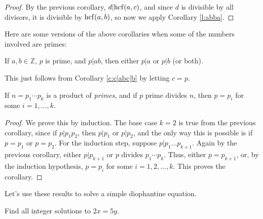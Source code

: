 \documentclass[11pt,dvipsnames]{book}
\def\hcf{{\rm hcf}}
\numberwithin{equation}{section} %
\numberwithin{figure}{section} %
\numberwithin{table}{section} %
\begin{document}
\begin{proof}
By the previous corollary, $d|\hcf(a,c)$, and since $d$ is divisible by all divisors, it is divisible by $\hcf(a,b)$, so now we apply Corollary \ref{l:abba}.
\end{proof}


Here are some versions of the above corollaries when some of the numbers involved are primes:

\begin{corollary}
\label{c:p|ab}
If $a,b\in\mathbb{Z}$, $p$ is prime, and $p|ab$, then either $p|a$ or $p|b$ (or both).
\end{corollary}

This just follows from Corollary \ref{c:c|abc|b} by letting $c=p$. 







%  
 \begin{corollary}
 \label{c:p|p...p}
If $n=p_1\cdots p_k$ is a product of \emph{primes}, and if $p$ prime divides $n$, then $p=p_i$ for some $i=1,\ldots, k$.
\end{corollary}
 
 \begin{proof}
We prove this by induction. The base case $k=2$ is true from the previous corollary, since if $p|p_{1}p_{2}$, then $p|p_{1}$ or $p|p_{2}$, and the only way this is possible is if $p=p_{1}$ or $p=p_{2}$. For the induction step, suppose $p|p_{1}...p_{k+1}$. Again by the  previous corollary, either $p|p_{k+1}$ or $p$ divides $p_1\cdots p_k$. Thus, either $p=p_{k+1}$, or, by the induction hypothesis, $p=p_i$ for some $i=1,2,...,k$. This proves the corollary.

 \end{proof}
 
 
 Let's use these results to solve a simple diophantine equation. 
 
 \begin{example}
 \label{ex:2x=5y}
 Find all integer solutions to $2x=5y$. 
 \end{example}
 
\end{document}

